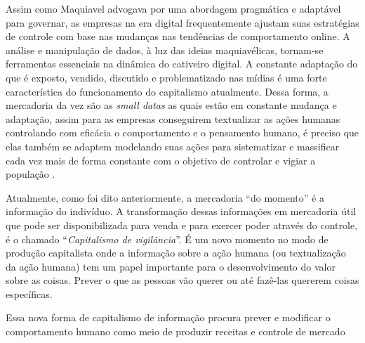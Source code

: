 \documentclass[
	12pt,
	openright,
	twoside,
	a4paper,
	english,
	french,
	spanish,
	brazil
]{abntex2}
\begin{document}
  Assim como Maquiavel advogava por uma abordagem pragmática e adaptável para
  governar, as empresas na era digital frequentemente ajustam suas estratégias
  de controle com base nas mudanças nas tendências de comportamento online. A
  análise e manipulação de dados, à luz das ideias maquiavélicas, tornam-se
  ferramentas essenciais na dinâmica do cativeiro digital. A constante adaptação
  do que é exposto, vendido, discutido e problematizado nas mídias é uma forte
  característica do funcionamento do capitalismo atualmente. Dessa forma, a
  mercadoria da vez são as \textit{small datas} as quais estão em constante
  mudança e adaptação, assim para as empresas conseguirem textualizar as ações
  humanas controlando com eficácia o comportamento e o pensamento humano, é
  preciso que elas também se adaptem modelando suas ações para sistematizar e
  massificar cada vez mais de forma constante com o objetivo de controlar e
  vigiar a população \cite{zuboff-capitalismo-vigilancia}.

  Atualmente, como foi dito anteriormente, a mercadoria ``do momento'' é a
  informação do indivíduo. A transformação dessas informações em mercadoria
  útil que pode ser disponibilizada para venda e para exercer poder através do
  controle, é o chamado ``\textit{Capitalismo de vigilância}''. É um novo
  momento no modo de produção capitalista onde a informação sobre a ação humana
  (ou textualização da ação humana) tem um papel importante para o
  desenvolvimento do valor sobre as coisas. Prever o que as pessoas vão querer
  ou até fazê-las quererem coisas específicas.

  \begin{citacao}
    Essa nova forma de capitalismo de informação procura prever e modificar o
    comportamento humano como meio de produzir receitas e controle de mercado
    \cite{zuboff-capitalismo-vigilancia}
  \end{citacao}
\end{document}
